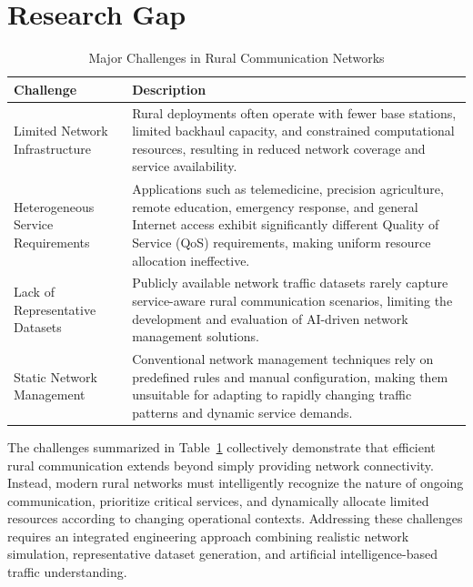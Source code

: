 \documentclass[12pt,a4paper]{report}
\begin{document}
	\section{Research Gap}
	\label{sec:problem_overview}
	
	
	\begin{table}[H]
		\centering
		\caption{Major Challenges in Rural Communication Networks}
		\label{tab:rural_challenges}
		
		\begin{tabular}{|p{4cm}|p{9cm}|}
			\hline
			
			\textbf{Challenge} &
			\textbf{Description}
			\\
			\hline
			
			Limited Network Infrastructure &
			Rural deployments often operate with fewer base stations, limited backhaul capacity, and constrained computational resources, resulting in reduced network coverage and service availability.
			\\
			\hline
			
			Heterogeneous Service Requirements &
			Applications such as telemedicine, precision agriculture, remote education, emergency response, and general Internet access exhibit significantly different Quality of Service (QoS) requirements, making uniform resource allocation ineffective.
			\\
			\hline
			
			Lack of Representative Datasets &
			Publicly available network traffic datasets rarely capture service-aware rural communication scenarios, limiting the development and evaluation of AI-driven network management solutions.
			\\
			\hline
			
			Static Network Management &
			Conventional network management techniques rely on predefined rules and manual configuration, making them unsuitable for adapting to rapidly changing traffic patterns and dynamic service demands.
			\\
			\hline
			
		\end{tabular}
		
	\end{table}
	
	The challenges summarized in Table~\ref{tab:rural_challenges} collectively demonstrate that efficient rural communication extends beyond simply providing network connectivity. Instead, modern rural networks must intelligently recognize the nature of ongoing communication, prioritize critical services, and dynamically allocate limited resources according to changing operational contexts. Addressing these challenges requires an integrated engineering approach combining realistic network simulation, representative dataset generation, and artificial intelligence-based traffic understanding.
	
\end{document}
